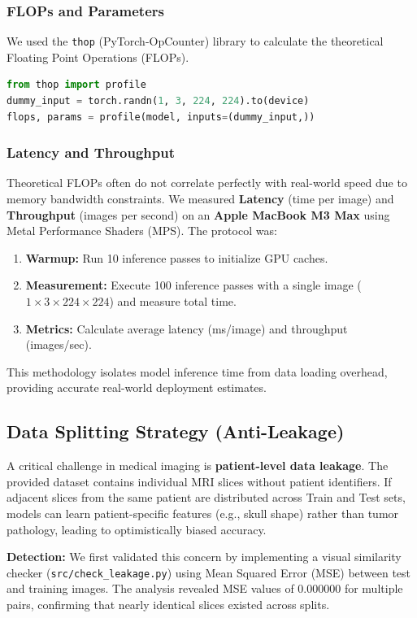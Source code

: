 \documentclass[12pt, a4paper]{article}
\begin{document}
\subsubsection{FLOPs and Parameters}
We used the \texttt{thop} (PyTorch-OpCounter) library to calculate the theoretical Floating Point Operations (FLOPs).
\begin{lstlisting}[language=Python, caption=FLOPs Calculation Code Snippet]
from thop import profile
dummy_input = torch.randn(1, 3, 224, 224).to(device)
flops, params = profile(model, inputs=(dummy_input,))
\end{lstlisting}

\subsubsection{Latency and Throughput}
Theoretical FLOPs often do not correlate perfectly with real-world speed due to memory bandwidth constraints. We measured \textbf{Latency} (time per image) and \textbf{Throughput} (images per second) on an \textbf{Apple MacBook M3 Max} using Metal Performance Shaders (MPS). The protocol was:
\begin{enumerate}
    \item \textbf{Warmup:} Run 10 inference passes to initialize GPU caches.
    \item \textbf{Measurement:} Execute 100 inference passes with a single image ($1 \times 3 \times 224 \times 224$) and measure total time.
    \item \textbf{Metrics:} Calculate average latency (ms/image) and throughput (images/sec).
\end{enumerate}
This methodology isolates model inference time from data loading overhead, providing accurate real-world deployment estimates.
\subsection{Data Splitting Strategy (Anti-Leakage)}
A critical challenge in medical imaging is \textbf{patient-level data leakage}. The provided dataset contains individual MRI slices without patient identifiers. If adjacent slices from the same patient are distributed across Train and Test sets, models can learn patient-specific features (e.g., skull shape) rather than tumor pathology, leading to optimistically biased accuracy.

\textbf{Detection:} We first validated this concern by implementing a visual similarity checker (\texttt{src/check\_leakage.py}) using Mean Squared Error (MSE) between test and training images. The analysis revealed MSE values of 0.000000 for multiple pairs, confirming that nearly identical slices existed across splits.
\end{document}
